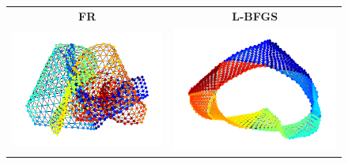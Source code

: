 \documentclass[dvipdfmx,journal]{IEEEtran}
\begin{document}
\begin{figure}[t]
  \centering
  \begin{tabular}{cc}
    \large{\textbf{FR}}                                          & \large{\textbf{L-BFGS}}   \\
    \begin{minipage}{0.45\columnwidth}
      \centering
      \includegraphics[width=\columnwidth]{jagmesh1_FR_50iter.png}
    \end{minipage} &
    \begin{minipage}{0.45\columnwidth}
      \centering
      \includegraphics[width=\columnwidth]{jagmesh1_LBFGS_50iter.png}
    \end{minipage}                           \\

\end{tabular}
\end{figure}
\end{document}
